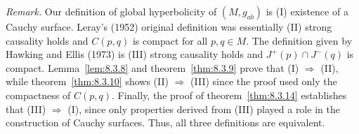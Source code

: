 \medskip
\noindent\emph{Remark.} Our definition of global hyperbolicity of \((M,g_{ab})\)
is (I) existence of a Cauchy surface. Leray's (1952) original definition was
essentially (II) strong causality holds and \(C(p,q)\) is compact for all
\(p,q\in M\). The definition given by Hawking and Ellis (1973) is (III) strong
causality holds and \(J^+(p)\cap J^-(q)\) is compact. Lemma~\ref{lem:8.3.8} and
theorem~\ref{thm:8.3.9} prove that (I) \(\Rightarrow\) (II), while
theorem~\ref{thm:8.3.10} shows (II) \(\Rightarrow\) (III) since the proof used
only the compactness of \(C(p,q)\). Finally, the proof of theorem~\ref{thm:8.3.14}
establishes that (III) \(\Rightarrow\) (I), since only properties derived from
(III) played a role in the construction of Cauchy surfaces. Thus, all three
definitions are equivalent.
